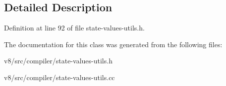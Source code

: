 \subsection{Detailed Description}


Definition at line 92 of file state-\/values-\/utils.\+h.



The documentation for this class was generated from the following files\+:\begin{DoxyCompactItemize}
\item 
v8/src/compiler/state-\/values-\/utils.\+h\item 
v8/src/compiler/state-\/values-\/utils.\+cc\end{DoxyCompactItemize}
